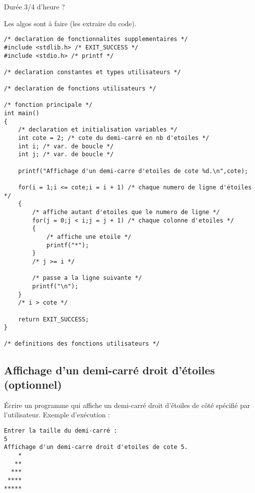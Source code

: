 \begin{correction}
Durée 3/4 d'heure ?

Les algos sont à faire (les extraire du code).

\begin{verbatim}
/* declaration de fonctionnalites supplementaires */
#include <stdlib.h> /* EXIT_SUCCESS */
#include <stdio.h> /* printf */

/* declaration constantes et types utilisateurs */

/* declaration de fonctions utilisateurs */

/* fonction principale */
int main()
{
    /* declaration et initialisation variables */
    int cote = 2; /* cote du demi-carré en nb d'etoiles */
    int i; /* var. de boucle */
    int j; /* var. de boucle */

    printf("Affichage d'un demi-carre d'etoiles de cote %d.\n",cote);

    for(i = 1;i <= cote;i = i + 1) /* chaque numero de ligne d'étoiles */
    {
        /* affiche autant d'etoiles que le numero de ligne */
        for(j = 0;j < i;j = j + 1) /* chaque colonne d'etoiles */
        {
            /* affiche une etoile */
            printf("*");
        }
        /* j >= i */

        /* passe a la ligne suivante */
        printf("\n");
    }
    /* i > cote */

    return EXIT_SUCCESS;
}

/* definitions des fonctions utilisateurs */
\end{verbatim}
\end{correction}


\subsection{Affichage d'un demi-carré droit d'étoiles (optionnel)}


Écrire un programme qui affiche un demi-carré droit d'étoiles de côté spécifié par l'utilisateur. Exemple d'exécution :
\begin{small}
\begin{verbatim}
Entrer la taille du demi-carré :
5
Affichage d'un demi-carre droit d'etoiles de cote 5.
    *
   **
  ***
 ****
*****
\end{verbatim}
\end{small}

